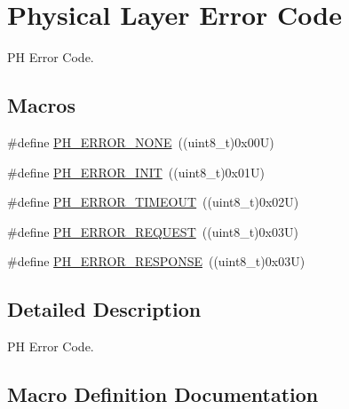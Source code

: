 \hypertarget{group___p_h___error___code}{}\section{Physical Layer Error Code}
\label{group___p_h___error___code}


PH Error Code.  


\subsection*{Macros}
\begin{DoxyCompactItemize}
\item 
\#define \hyperlink{group___p_h___error___code_ga67055c114ec03135c28e1cb6a3d68f5a}{P\+H\+\_\+\+E\+R\+R\+O\+R\+\_\+\+N\+O\+NE}~((uint8\+\_\+t)0x00\+U)
\item 
\#define \hyperlink{group___p_h___error___code_ga15fbdf4edfc98283ef0f1b7c2fc0a47b}{P\+H\+\_\+\+E\+R\+R\+O\+R\+\_\+\+I\+N\+IT}~((uint8\+\_\+t)0x01\+U)
\item 
\#define \hyperlink{group___p_h___error___code_gaae8d2172a18fdde6957c77af378c2574}{P\+H\+\_\+\+E\+R\+R\+O\+R\+\_\+\+T\+I\+M\+E\+O\+UT}~((uint8\+\_\+t)0x02\+U)
\item 
\#define \hyperlink{group___p_h___error___code_ga76393e5665e76130e95c73aab378c53d}{P\+H\+\_\+\+E\+R\+R\+O\+R\+\_\+\+R\+E\+Q\+U\+E\+ST}~((uint8\+\_\+t)0x03\+U)
\item 
\#define \hyperlink{group___p_h___error___code_ga104872de885107db19b579c81a62f563}{P\+H\+\_\+\+E\+R\+R\+O\+R\+\_\+\+R\+E\+S\+P\+O\+N\+SE}~((uint8\+\_\+t)0x03\+U)
\end{DoxyCompactItemize}


\subsection{Detailed Description}
PH Error Code. 



\subsection{Macro Definition Documentation}
